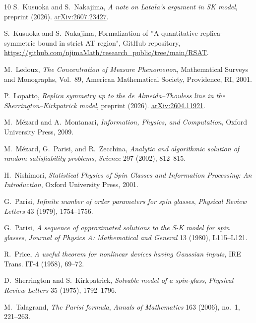 \documentclass[11pt]{article}
\numberwithin{equation}{section}
\newcommand{\1}{\mathbf 1}
\begin{document}
\begin{thebibliography}{10}
S.~Kusuoka and S.~Nakajima,
\newblock
\emph{A note on Lata{\l}a's argument in SK model},
\newblock preprint (2026).
\href{https://arxiv.org/abs/2607.23427}{arXiv:2607.23427}.

S.~Kusuoka and S.~Nakajima,
\newblock Formalization of ''A quantitative replica-symmetric bound in strict AT region",
\newblock GitHub repository, \url{https://github.com/njimaMath/research_public/tree/main/RSAT}.

M.~Ledoux,
\newblock
\emph{The Concentration of Measure Phenomenon},
\newblock Mathematical Surveys and Monographs, Vol.~89,
American Mathematical Society, Providence, RI, 2001.

P.~Lopatto,
\newblock
\emph{Replica symmetry up to the de Almeida--Thouless line in the
Sherrington--Kirkpatrick model},
\newblock preprint (2026).
\href{https://arxiv.org/abs/2604.11921}{arXiv:2604.11921}.

M.~M{\'e}zard and A.~Montanari,
\newblock
\emph{Information, Physics, and Computation},
\newblock Oxford University Press, 2009.

M.~M{\'e}zard, G.~Parisi, and R.~Zecchina,
\newblock
\emph{Analytic and algorithmic solution of random satisfiability problems},
\newblock \emph{Science} 297 (2002), 812--815.

H.~Nishimori,
\newblock
\emph{Statistical Physics of Spin Glasses and Information Processing:
An Introduction},
\newblock Oxford University Press, 2001.


G.~Parisi,
\newblock
\emph{Infinite number of order parameters for spin glasses},
\newblock \emph{Physical Review Letters} 43 (1979), 1754--1756.

G.~Parisi,
\newblock
\emph{A sequence of approximated solutions to the S-K model for spin glasses},
\newblock \emph{Journal of Physics A: Mathematical and General} 13 (1980),
L115--L121.

R.~Price,
\newblock
\emph{A useful theorem for nonlinear devices having Gaussian inputs},
\newblock IRE Trans. IT-4 (1958), 69--72.

D.~Sherrington and S.~Kirkpatrick,
\newblock
\emph{Solvable model of a spin-glass},
\newblock \emph{Physical Review Letters} 35 (1975), 1792--1796.

M.~Talagrand,
\newblock
\emph{The Parisi formula},
\newblock \emph{Annals of Mathematics} 163 (2006), no.~1, 221--263.


\end{thebibliography}
\end{document}
